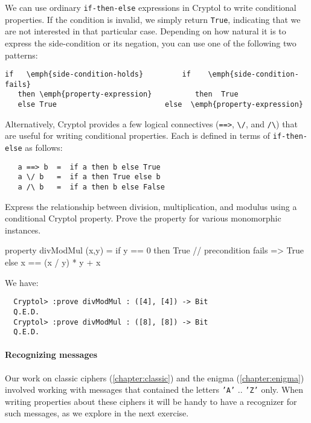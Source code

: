 We can use ordinary {\tt if-then-else} expressions in Cryptol to
write conditional properties.  If the condition is invalid, we simply return
{\tt True}, indicating that we are not interested in that particular
case. Depending on how natural it is to express the side-condition or
its negation, you can use one of the following two patterns:
\begin{Verbatim}[commandchars=\\\{\}]
   if   \emph{side-condition-holds}         if    \emph{side-condition-fails}
   then \emph{property-expression}          then  True
   else True                         else  \emph{property-expression}
\end{Verbatim}

Alternatively, Cryptol provides a few logical connectives
(\texttt{==>}, \texttt{\textbackslash/}, and \texttt{/\textbackslash})
that are useful for writing conditional properties. Each is defined in
terms of \texttt{if-then-else} as follows:

\begin{Verbatim}
   a ==> b  =  if a then b else True
   a \/ b   =  if a then True else b
   a /\ b   =  if a then b else False
\end{Verbatim}

\begin{Exercise}\label{ex:cond:1}
  Express the relationship between division, multiplication, and
  modulus using a conditional Cryptol property.  Prove the property
  for various monomorphic instances.\indMod\indDiv\indTimes\indThmCond
\end{Exercise}
\begin{Answer}
\begin{code}
  property divModMul (x,y) = if y == 0
                             then True   // precondition fails => True
                             else x == (x / y) * y + x %
\end{code}
We have:
\begin{Verbatim}
  Cryptol> :prove divModMul : ([4], [4]) -> Bit
  Q.E.D.
  Cryptol> :prove divModMul : ([8], [8]) -> Bit
  Q.E.D.
\end{Verbatim}
\end{Answer}

\paragraph*{Recognizing messages} Our work on classic ciphers
(\autoref{chapter:classic}) and the enigma
(\autoref{chapter:enigma}) involved working with messages that
contained the letters {\tt 'A'} .. {\tt 'Z'} only. When writing
properties about these ciphers it will be handy to have a recognizer
for such messages, as we explore in the next exercise.

